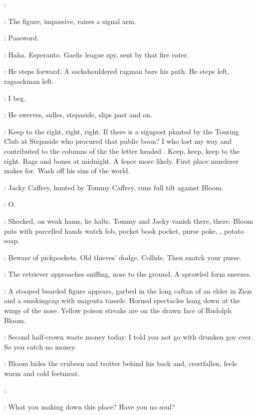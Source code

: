 \Bloom:

:
The figure, impassive, raises a signal arm.

\Figure:
Password. 

\Bloom:
Haha.
Esperanto.
Gaelic league spy, sent by that fire eater.

:
He steps forward.
A sackshouldered ragman bars his path.
He steps left, ragsackman left.

\Bloom:
I beg.

:
He swerves, sidles, stepaside, slips past and on.

\Bloom:
Keep to the right, right, right.
If there is a signpost planted by the Touring Club at Stepaside
who procured that public boon?
I who lost my way and contributed to the columns of the 
the letter headed .
Keep, keep, keep to the right.
Rags and bones at midnight.
A fence more likely.
First place murderer makes for.
Wash off his sins of the world.

:
Jacky Caffrey, hunted by Tommy Caffrey, runs full tilt against Bloom.

\Bloom:
O.

:
Shocked, on weak hams, he halts.
Tommy and Jacky vanish there, there.
Bloom pats with parcelled hands watch fob, pocket book pocket, purse poke,
, potato soap.

\Bloom:
Beware of pickpockets.
Old thieves' dodge.
Collide.
Then snatch your purse.

:
The retriever approaches sniffing, nose to the ground.
A sprawled form sneezes.

:
A stooped bearded figure appears, garbed in the long caftan of an elder in Zion
and a smokingcap with magenta tassels.
Horned spectacles hang down at the wings of the nose.
Yellow poison streaks are on the drawn face of Rudolph Bloom.

\Rudolph:
Second half-crown waste money today.
I told you not go with drunken goy ever.
So you catch no money.

:
Bloom hides the crubeen and trotter behind his back and,
crestfallen, feels warm and cold feetmeat.

\Bloom:

\Rudolph:
What you making down this place?
Have you no soul?

